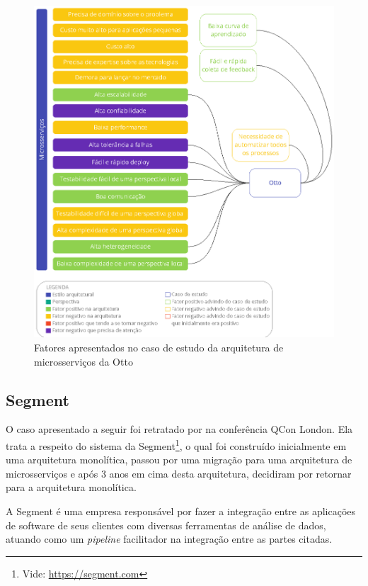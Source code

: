 \begin{figure}[h]
  \centering
  \includegraphics[keepaspectratio=true,scale=1]{figuras/analise-micro-otto.eps}
  \caption{Fatores apresentados no caso de estudo da arquitetura de microsserviços da Otto\label{fig:analise-micro-otto}}
\end{figure}

\subsection{Segment}

O caso apresentado a seguir foi retratado por  na
conferência QCon London. Ela trata a respeito do sistema da Segment\footnote{Vide:
\url{https://segment.com}}, o qual foi construído inicialmente em uma arquitetura monolítica,
passou por uma migração para uma arquitetura de microsserviços e após 3 anos em cima desta
arquitetura, decidiram por retornar para a arquitetura monolítica.

A Segment é uma empresa responsável por fazer a integração entre as aplicações de software de seus
clientes com diversas ferramentas de análise de dados, atuando como um \textit{pipeline} facilitador
na integração entre as partes citadas. 

